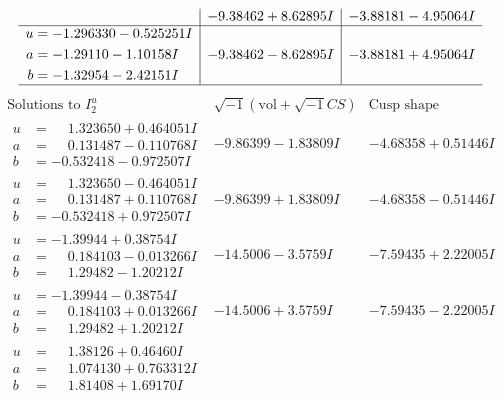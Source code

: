\documentclass[1p]{elsarticle_modified}
\theoremstyle{definition}
\newcommand{\I}{\sqrt{-1}}
\begin{document}
$$\begin{array}{c|c|c}
 & -9.38462 + 8.62895 I & -3.88181 - 4.95064 I \\ \hline\begin{aligned}
u &= -1.296330 - 0.525251 I \\
a &= -1.29110 - 1.10158 I \\
b &= -1.32954 - 2.42151 I\end{aligned}
 & -9.38462 - 8.62895 I & -3.88181 + 4.95064 I\\
 \hline 
 \end{array}$$\newpage$$\begin{array}{c|c|c}  
\text{Solutions to }I^u_{2}& \I (\text{vol} + \sqrt{-1}CS) & \text{Cusp shape}\\
 \hline 
\begin{aligned}
u &= \phantom{-}1.323650 + 0.464051 I \\
a &= \phantom{-}0.131487 - 0.110768 I \\
b &= -0.532418 - 0.972507 I\end{aligned}
 & -9.86399 - 1.83809 I & -4.68358 + 0.51446 I \\ \hline\begin{aligned}
u &= \phantom{-}1.323650 - 0.464051 I \\
a &= \phantom{-}0.131487 + 0.110768 I \\
b &= -0.532418 + 0.972507 I\end{aligned}
 & -9.86399 + 1.83809 I & -4.68358 - 0.51446 I \\ \hline\begin{aligned}
u &= -1.39944 + 0.38754 I \\
a &= \phantom{-}0.184103 - 0.013266 I \\
b &= \phantom{-}1.29482 - 1.20212 I\end{aligned}
 & -14.5006 - 3.5759 I & -7.59435 + 2.22005 I \\ \hline\begin{aligned}
u &= -1.39944 - 0.38754 I \\
a &= \phantom{-}0.184103 + 0.013266 I \\
b &= \phantom{-}1.29482 + 1.20212 I\end{aligned}
 & -14.5006 + 3.5759 I & -7.59435 - 2.22005 I \\ \hline\begin{aligned}
u &= \phantom{-}1.38126 + 0.46460 I \\
a &= \phantom{-}1.074130 + 0.763312 I \\
b &= \phantom{-}1.81408 + 1.69170 I\end{aligned}

\end{array}$$
\end{document}
